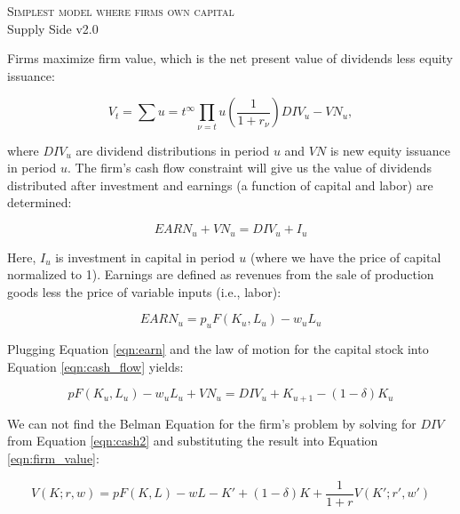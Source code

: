 \documentclass[a4paper]{article}
\begin{document}


\begin{center}
\large  \textsc {Simplest model where firms own capital}\\
\small{Supply Side v2.0}\\
\end{center}
\vspace{.5\baselineskip}


Firms maximize firm value, which is the net present value of dividends less equity issuance:

\begin{equation}
\label{eqn:firm_value}
V_{t} = \sum{u=t}^{\infty} \prod_{\nu=t}{u} \left(\frac{1}{1+r_{\nu}}\right) DIV_{u}-VN_{u},
\end{equation}

\noindent\noindent where $DIV_{u}$ are dividend distributions in period $u$ and $VN$ is new equity issuance in period $u$.  The firm's cash flow constraint will give us the value of dividends distributed after investment and earnings (a function of capital and labor) are determined:

\begin{equation}
\label{eqn:cash_flow}
EARN_{u}+VN_{u} = DIV_{u} + I_{u}
\end{equation}

\noindent\noindent Here, $I_{u}$ is investment in capital in period $u$ (where we have the price of capital normalized to 1).  Earnings are defined as revenues from the sale of production goods less the price of variable inputs (i.e., labor):

\begin{equation}
\label{eqn:earn}
EARN_{u}= p_{u}F(K_{u},L_{u}) - w_{u}L_{u}
\end{equation}

\noindent\noindent Plugging Equation \ref{eqn:earn} and the law of motion for the capital stock into Equation \ref{eqn:cash_flow} yields:

\begin{equation}
\label{eqn:cash2}
pF(K_{u},L_{u}) - w_{u}L_{u} + VN_{u} = DIV_{u} + K_{u+1} - (1-\delta)K_{u}
\end{equation}

\noindent\noindent We can not find the Belman Equation for the firm's problem by solving for $DIV$ from Equation \ref{eqn:cash2} and substituting the result into Equation \ref{eqn:firm_value}:

\begin{equation}
\label{eqn:cash2}
V(K; r, w) = pF(K,L) - wL  - K' + (1-\delta)K + \frac{1}{1+r}V(K';r',w')
\end{equation}
\end{document}
